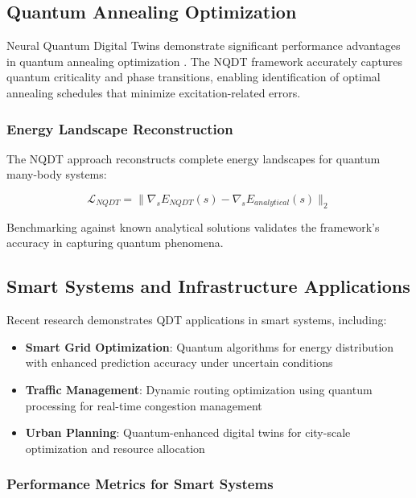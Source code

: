 \subsection{Quantum Annealing Optimization}

Neural Quantum Digital Twins demonstrate significant performance advantages in quantum annealing optimization \cite{lu2024neural}. The NQDT framework accurately captures quantum criticality and phase transitions, enabling identification of optimal annealing schedules that minimize excitation-related errors.

\subsubsection{Energy Landscape Reconstruction}

The NQDT approach reconstructs complete energy landscapes for quantum many-body systems:

\begin{equation}
\mathcal{L}_{NQDT} = \|\nabla_s E_{NQDT}(s) - \nabla_s E_{analytical}(s)\|_2
\end{equation}

Benchmarking against known analytical solutions validates the framework's accuracy in capturing quantum phenomena.

\subsection{Smart Systems and Infrastructure Applications}

Recent research \cite{arxiv2025smart} demonstrates QDT applications in smart systems, including:

\begin{itemize}
    \item \textbf{Smart Grid Optimization}: Quantum algorithms for energy distribution with enhanced prediction accuracy under uncertain conditions
    \item \textbf{Traffic Management}: Dynamic routing optimization using quantum processing for real-time congestion management
    \item \textbf{Urban Planning}: Quantum-enhanced digital twins for city-scale optimization and resource allocation
\end{itemize}

\subsubsection{Performance Metrics for Smart Systems}

